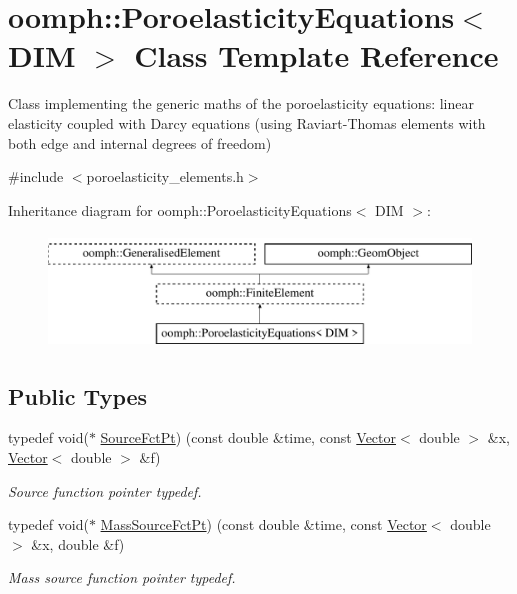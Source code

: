 \hypertarget{classoomph_1_1PoroelasticityEquations}{}\section{oomph\+:\+:Poroelasticity\+Equations$<$ D\+IM $>$ Class Template Reference}
\label{classoomph_1_1PoroelasticityEquations}


Class implementing the generic maths of the poroelasticity equations\+: linear elasticity coupled with Darcy equations (using Raviart-\/\+Thomas elements with both edge and internal degrees of freedom)  




{\ttfamily \#include $<$poroelasticity\+\_\+elements.\+h$>$}

Inheritance diagram for oomph\+:\+:Poroelasticity\+Equations$<$ D\+IM $>$\+:\begin{figure}[H]
\begin{center}
\leavevmode
\includegraphics[height=3.000000cm]{classoomph_1_1PoroelasticityEquations}
\end{center}
\end{figure}
\subsection*{Public Types}
\begin{DoxyCompactItemize}
\item 
typedef void($\ast$ \hyperlink{classoomph_1_1PoroelasticityEquations_a234bc29fbd4c3255ef903a3cb5f6361f}{Source\+Fct\+Pt}) (const double \&time, const \hyperlink{classoomph_1_1Vector}{Vector}$<$ double $>$ \&x, \hyperlink{classoomph_1_1Vector}{Vector}$<$ double $>$ \&f)
\begin{DoxyCompactList}\small\item\em Source function pointer typedef. \end{DoxyCompactList}\item 
typedef void($\ast$ \hyperlink{classoomph_1_1PoroelasticityEquations_a8edb2644708db2f2ae03254ea3143262}{Mass\+Source\+Fct\+Pt}) (const double \&time, const \hyperlink{classoomph_1_1Vector}{Vector}$<$ double $>$ \&x, double \&f)
\begin{DoxyCompactList}\small\item\em Mass source function pointer typedef. \end{DoxyCompactList}\end{DoxyCompactItemize}
